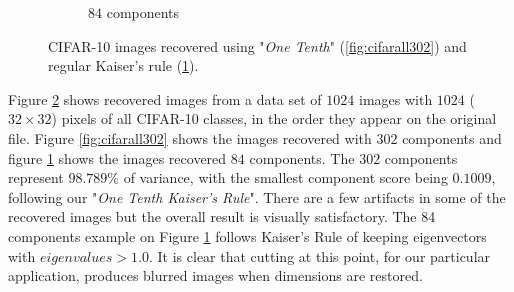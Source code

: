 \documentclass{article} %
\begin{document}
\begin{figure}[h]
\begin{subfigure}{.5\textwidth}
  \caption{$84$ components}
  \label{fig:cifarall84}
\end{subfigure}
\caption{CIFAR-10 images recovered using "\emph{One Tenth}" (\ref{fig:cifarall302}) and regular Kaiser's rule (\ref{fig:cifarall84}).}
\label{fig:sampleCifar10}
\end{figure}

Figure \ref{fig:sampleCifar10} shows recovered images from a data set of $1024$ images with $1024$ ($32\times 32$) pixels of all CIFAR-10 classes, in the order they appear on the original file. Figure \ref{fig:cifarall302} shows the images recovered with $302$ components and figure \ref{fig:cifarall84} shows the images recovered $84$ components. The $302$ components  represent $98.789\%$ of variance, with the smallest component score being $0.1009$, following our "\emph{One Tenth Kaiser's Rule}". There are a few artifacts in some of the recovered images but the overall result is visually satisfactory. The 84 components example on Figure \ref{fig:cifarall84} follows Kaiser's Rule of keeping eigenvectors with $eigenvalues > 1.0$. It is clear that cutting at this point, for our particular application, produces blurred images when dimensions are restored.\par
\end{document}
